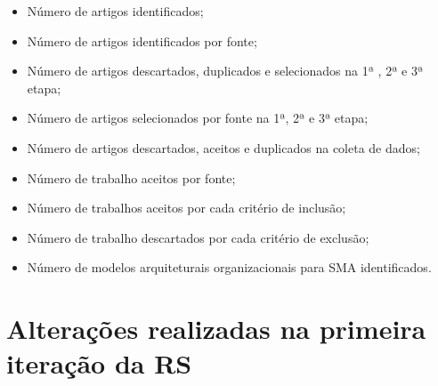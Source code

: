 \begin{itemize}
  \item Número de artigos identificados;
  \item Número de artigos identificados por fonte;
  \item Número de artigos descartados, duplicados e selecionados na 1ª , 2ª e 3ª etapa;
  \item Número de artigos selecionados por fonte na 1ª, 2ª e 3ª etapa;
  \item Número de artigos descartados, aceitos e duplicados na coleta de dados;
  \item Número de trabalho aceitos por fonte;
  \item Número de trabalhos aceitos por cada critério de inclusão;
  \item Número de trabalho descartados por cada critério de exclusão;
  \item Número de modelos arquiteturais organizacionais para SMA identificados.
\end{itemize}


\section{Alterações realizadas na primeira iteração da RS}








